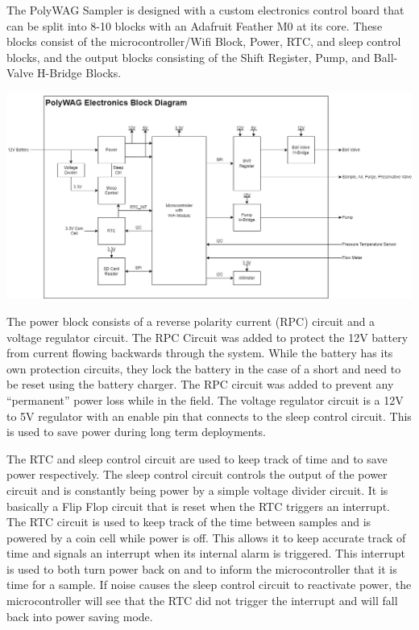 \documentclass[11pt, letterpaper]{article}
\begin{document}
The PolyWAG Sampler is designed with a custom electronics control board that can be split into 8-10 blocks with an Adafruit Feather M0 at its core. These blocks consist of the microcontroller/Wifi Block, Power, RTC, and sleep control blocks, and the output blocks consisting of the Shift Register, Pump, and Ball-Valve H-Bridge Blocks. 

\begin{center}
	\includegraphics[scale=0.4]{./Assets/Electronics Block Diagram.png}
\end{center}

The power block consists of a reverse polarity current (RPC) circuit and a voltage regulator circuit. The RPC Circuit was added to protect the 12V battery from current flowing backwards through the system. While the battery has its own protection circuits, they lock the battery in the case of a short and need to be reset using the battery charger. The RPC circuit was added to prevent any “permanent” power loss while in the field. The voltage regulator circuit is a 12V to 5V regulator with an enable pin that connects to the sleep control circuit. This is used to save power during long term deployments. 

The RTC and sleep control circuit are used to keep track of time and to save power respectively. The sleep control circuit controls the output of the power circuit and is constantly being power by a simple voltage divider circuit. It is basically a Flip Flop circuit that is reset when the RTC triggers an interrupt. The RTC circuit is used to keep track of the time between samples and is powered by a coin cell while power is off. This allows it to keep accurate track of time and signals an interrupt when its internal alarm is triggered. This interrupt is used to both turn power back on and to inform the microcontroller that it is time for a sample. If noise causes the sleep control circuit to reactivate power, the microcontroller will see that the RTC did not trigger the interrupt and will fall back into power saving mode. 
\end{document}
